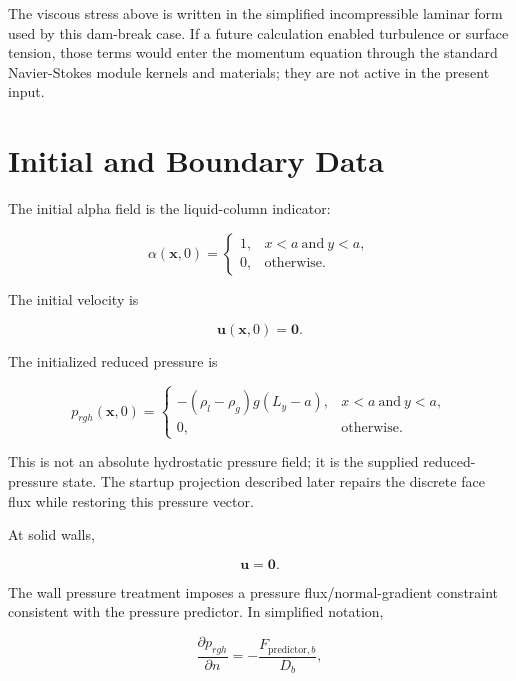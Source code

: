 \documentclass[11pt]{article}
\begin{document}
The viscous stress above is written in the simplified incompressible laminar
form used by this dam-break case.  If a future calculation enabled turbulence
or surface tension, those terms would enter the momentum equation through the
standard Navier-Stokes module kernels and materials; they are not active in the
present input.

\section{Initial and Boundary Data}

The initial alpha field is the liquid-column indicator:

\begin{equation}
  \alpha(\mathbf{x},0)
  =
  \begin{cases}
    1, & x<a\ \text{and}\ y<a, \\
    0, & \text{otherwise}.
  \end{cases}
\end{equation}

The initial velocity is

\begin{equation}
  \mathbf{u}(\mathbf{x},0)=\mathbf{0}.
\end{equation}

The initialized reduced pressure is

\begin{equation}
  p_{rgh}(\mathbf{x},0)
  =
  \begin{cases}
    -(\rho_l-\rho_g)g(L_y-a), & x<a\ \text{and}\ y<a, \\
    0, & \text{otherwise}.
  \end{cases}
  \label{eq:init-prgh}
\end{equation}

This is not an absolute hydrostatic pressure field; it is the supplied
reduced-pressure state.  The startup projection described later repairs the
discrete face flux while restoring this pressure vector.

At solid walls,

\begin{equation}
  \mathbf{u}=\mathbf{0}.
\end{equation}

The wall pressure treatment imposes a pressure flux/normal-gradient constraint
consistent with the pressure predictor.  In simplified notation,

\begin{equation}
  \frac{\partial p_{rgh}}{\partial n}
  =
  -\frac{F_{\mathrm{predictor},b}}{D_b},
  \label{eq:wall-pressure-gradient}
\end{equation}
\end{document}
